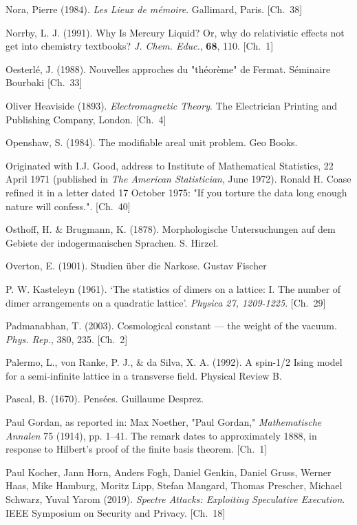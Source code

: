 \begin{list}{}{%
  \setlength{\leftmargin}{2em}%
  \setlength{\itemindent}{-2em}%
  \setlength{\itemsep}{0.35\baselineskip}%
  \setlength{\parsep}{0pt}%
  \setlength{\topsep}{0.5em}}
\item Nora, Pierre (1984). \textit{Les Lieux de mémoire}. Gallimard, Paris. \hfill {\scriptsize [Ch.~38]}
\item Norrby, L. J. (1991). Why Is Mercury Liquid? Or, why do relativistic effects not get into chemistry textbooks? \textit{J. Chem. Educ.}, \textbf{68}, 110. \hfill {\scriptsize [Ch.~1]}
\item Oesterlé, J. (1988). Nouvelles approches du "théorème" de Fermat. Séminaire Bourbaki \hfill {\scriptsize [Ch.~33]}
\item Oliver Heaviside (1893). \textit{Electromagnetic Theory}. The Electrician Printing and Publishing Company, London. \hfill {\scriptsize [Ch.~4]}
\item Openshaw, S. (1984). The modifiable areal unit problem. Geo Books.
\item Originated with I.J. Good, address to Institute of Mathematical Statistics, 22 April 1971 (published in \textit{The American Statistician}, June 1972). Ronald H. Coase refined it in a letter dated 17 October 1975: "If you torture the data long enough nature will confess.". \hfill {\scriptsize [Ch.~40]}
\item Osthoff, H. \& Brugmann, K. (1878). Morphologische Untersuchungen auf dem Gebiete der indogermanischen Sprachen. S. Hirzel.
\item Overton, E. (1901). Studien über die Narkose. Gustav Fischer
\item P. W. Kasteleyn (1961). `The statistics of dimers on a lattice: I. The number of dimer arrangements on a quadratic lattice'. \textit{Physica 27, 1209-1225}. \hfill {\scriptsize [Ch.~29]}
\item Padmanabhan, T. (2003). Cosmological constant — the weight of the vacuum. \textit{Phys. Rep.}, 380, 235. \hfill {\scriptsize [Ch.~2]}
\item Palermo, L., von Ranke, P. J., \& da Silva, X. A. (1992). A spin-1/2 Ising model for a semi-infinite lattice in a transverse field. Physical Review B.
\item Pascal, B. (1670). Pensées. Guillaume Desprez.
\item Paul Gordan, as reported in: Max Noether, "Paul Gordan," \textit{Mathematische Annalen} 75 (1914), pp. 1–41. The remark dates to approximately 1888, in response to Hilbert's proof of the finite basis theorem. \hfill {\scriptsize [Ch.~1]}
\item Paul Kocher, Jann Horn, Anders Fogh, Daniel Genkin, Daniel Gruss, Werner Haas, Mike Hamburg, Moritz Lipp, Stefan Mangard, Thomas Prescher, Michael Schwarz, Yuval Yarom (2019). \textit{Spectre Attacks: Exploiting Speculative Execution}. IEEE Symposium on Security and Privacy. \hfill {\scriptsize [Ch.~18]}

\end{list}
